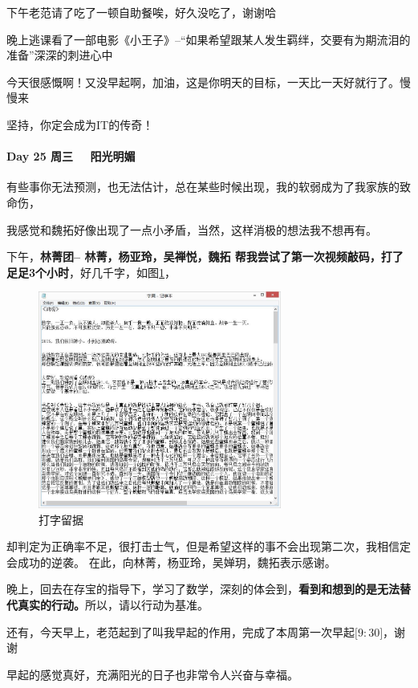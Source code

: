 \documentclass[UTF8,a4paper,8pt]{ctexart}
\begin{document}
 		   下午老范请了吃了一顿自助餐唉，好久没吃了，谢谢哈~
 		   
 		   晚上逃课看了一部电影《小王子》--“如果希望跟某人发生羁绊，交要有为期流泪的准备”深深的刺进心中
 		   
 		   今天很感慨啊！又没早起啊，加油，这是你明天的目标，一天比一天好就行了。慢慢来
 		   
 		    坚持，你定会成为IT的传奇！
 		    
 	   \paragraph{Day 25  周三 \  \ 阳光明媚}
 		   有些事你无法预测，也无法估计，总在某些时候出现，我的软弱成为了我家族的致命伤，
 		   
 		   我感觉和魏拓好像出现了一点小矛盾，当然，这样消极的想法我不想再有。
 		   
 		   下午，\textbf{林菁团-- 林菁，杨亚玲，吴禅悦，魏拓 帮我尝试了第一次视频敲码，打了足足3个小时}，好几千字，如图\ref{fig:Code}，
 		   \begin{figure}[h]
 		   	\centering
 		   	\includegraphics[width=8cm,clip]{20151125_Code.jpg} 	
 		   	\caption{打字留据}	
 		   	\label{fig:Code}
 		   \end{figure}
 		   
 		   却判定为正确率不足，很打击士气，但是希望这样的事不会出现第二次，我相信定会成功的逆袭。
 		   在此，向林菁，杨亚玲，吴婵玥，魏拓表示感谢。
 		   
 		   晚上，回去在存宝的指导下，学习了数学，深刻的体会到，\textbf{看到和想到的是无法替代真实的行动。}所以，请以行动为基准。
 		   
 		   还有，今天早上，老范起到了叫我早起的作用，完成了本周第一次早起$\big[9:30\big]$，谢谢
 		   
 		   早起的感觉真好，充满阳光的日子也非常令人兴奋与幸福。
 		   
\end{document}
